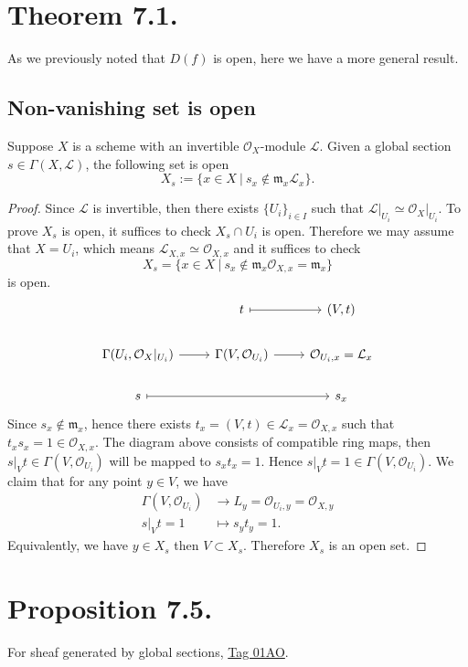 \section{Theorem 7.1.}

As we previously noted that $D(f)$ is open, here we have a more general result. 
\subsection*{Non-vanishing set is open}
\begin{proposition}
    Suppose $X$ is a scheme with an invertible $\mathcal O_X$-module $\mathcal L$. Given a global section $s\in\Gamma(X,\mathcal L)$, the following set is open
    \[X_s:=\{x\in X ~\vert~ s_x \notin \mathfrak m_x\mathcal L_x\}.\]
\end{proposition}
\begin{proof}
    Since $\mathcal L$ is invertible, then there exists $\{U_i\}_{i\in I}$ such that $\mathcal L\vert_{U_i}\simeq \mathcal O_{X}\vert_{U_i}$. To prove $X_s$ is open, it suffices to check $X_s\cap U_i$ is open. Therefore we may assume that $X=U_i$, which means $\mathcal L_{X,x}\simeq \mathcal O_{X,x}$ and it suffices to check 
    \[X_s=\{x\in X~\vert~ s_x\notin \mathfrak m _x\mathcal O_{X,x}=\mathfrak m _x\}\] is open. 
    \[%
    \begin{tikzcd}
                                                     & t \arrow[r, maps to]                   & {(V,t)}                           \\
    {\Gamma(U_i,\mathcal O_X \vert_{U_i})} \arrow[r] & {\Gamma(V,\mathcal O_{U_i})} \arrow[r] & {\mathcal O_{U_i,x}=\mathcal L_x} \\
    s \arrow[rr, maps to]                            &                                        & s_x                              
    \end{tikzcd}\]
    Since $s_x\notin \mathfrak m_x$, hence there exists $t_x=(V,t)\in \mathcal L_x=\mathcal O_{X,x}$ such that $t_xs_x=1\in\mathcal O_{X,x}$. The diagram above consists of compatible ring maps, then $s\vert_V t \in \Gamma(V,\mathcal O_{U_i})$ will be mapped to $s_xt_x=1$. Hence $s\vert_V t=1\in \Gamma(V,\mathcal O_{U_i})$. 
    We claim that for any point $y\in V$, we have \begin{align*}
        \Gamma(V,\mathcal O_{U_i}) &\to L_y=\mathcal O_{U_i,y}=\mathcal O_{X,y}\\
        s\vert_V t =1 &\mapsto s_yt_y=1.
    \end{align*}
    Equivalently, we have $y\in X_s$ then $V\subset X_s$. Therefore $X_s$ is an open set. 
\end{proof}

\section{Proposition 7.5.}

For sheaf generated by global sections, \href{https://stacks.math.columbia.edu/tag/01AO}{Tag 01AO}.